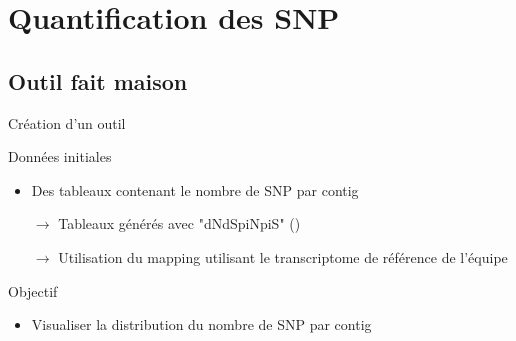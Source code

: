 \section{Quantification des SNP}
\begin{frame}
	\tableofcontents[sectionstyle=show/shaded,subsectionstyle=show/show/hide,subsubsectionstyle=show/show/hide]
\end{frame}

\subsection{Outil fait maison}
\begin{frame}{Création d'un outil}
    \begin{block}{Données initiales}
        \begin{itemize}
            \item Des tableaux contenant le nombre de SNP par contig
            \item[$\rightarrow$] Tableaux  générés avec "dNdSpiNpiS" (\cite{dNdSpNpS})
            \item[$\rightarrow$] Utilisation du mapping utilisant le transcriptome de référence de l'équipe
        \end{itemize}
    \end{block}



    \pause

    \begin{alertblock}{Objectif}
        \begin{itemize}
            \item Visualiser la distribution du nombre de SNP par contig
        \end{itemize}
    \end{alertblock}

\end{frame}

